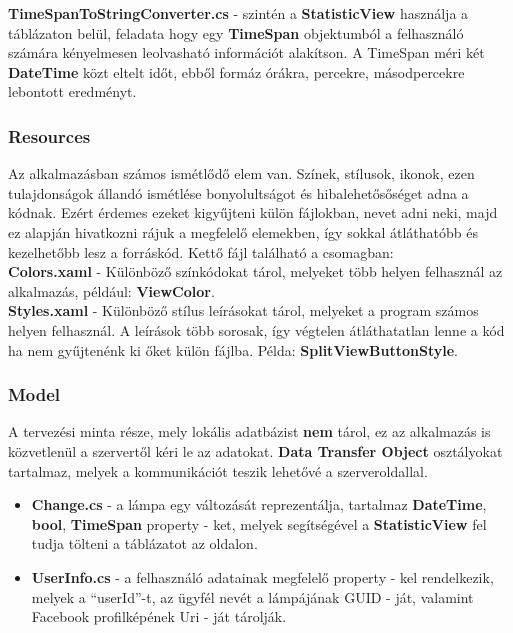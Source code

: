\documentclass[a4paper,12pt]{report}
\begin{document}
    \textbf{TimeSpanToStringConverter.cs} - szintén a \textbf{StatisticView} használja a táblázaton belül, feladata hogy egy \textbf{TimeSpan}
    objektumból a felhasználó számára kényelmesen leolvasható információt alakítson. A TimeSpan méri két \textbf{DateTime} közt eltelt
    időt, ebből formáz órákra, percekre, másodpercekre lebontott eredményt.

    \subsubsection{Resources}
    Az alkalmazásban számos ismétlődő elem van. Színek, stílusok, ikonok, ezen tulajdonságok állandó ismétlése bonyolultságot
    és hibalehetősőséget adna a kódnak. Ezért érdemes ezeket kigyűjteni külön fájlokban, nevet adni neki, majd ez alapján hivatkozni
    rájuk a megfelelő elemekben, így sokkal átláthatóbb és kezelhetőbb lesz a forráskód. Kettő fájl található a csomagban:\\

    \textbf{Colors.xaml} - Különböző színkódokat tárol, melyeket több helyen felhasznál az alkalmazás, például: \textbf{ViewColor}.\\

    \textbf{Styles.xaml} - Különböző stílus leírásokat tárol, melyeket a program számos helyen felhasznál. A leírások több sorosak,
    így végtelen átláthatatlan lenne a kód ha nem gyűjtenénk ki őket külön fájlba. Példa: \textbf{SplitViewButtonStyle}.

    \subsubsection{Model}
    A tervezési minta része, mely lokális adatbázist \textbf{nem} tárol, ez az alkalmazás is közvetlenül a szervertől kéri le az
    adatokat. \textbf{Data Transfer Object} osztályokat tartalmaz, melyek a kommunikációt teszik lehetővé a szerveroldallal.

    \begin{itemize}
        \item \textbf{Change.cs} - a lámpa egy változását reprezentálja, tartalmaz \textbf{DateTime}, \textbf{bool}, \textbf{TimeSpan} property - ket,
        melyek segítségével a \textbf{StatisticView} fel tudja tölteni a táblázatot az oldalon.
        \item \textbf{UserInfo.cs} - a felhasználó adatainak megfelelő property - kel rendelkezik, melyek a ``userId''-t, az ügyfél nevét
        a lámpájának GUID -  ját, valamint Facebook profilképének Uri - ját tárolják.
    \end{itemize}
\end{document}
